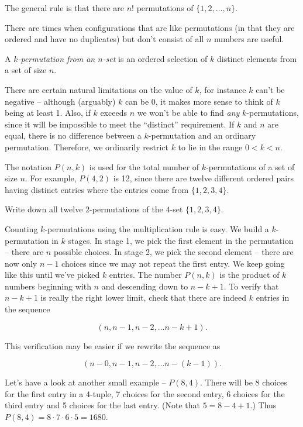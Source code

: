 The general rule is that there are $n!$ permutations of $\{1, 2, \ldots , n\}$.

There are times when configurations that are like permutations (in that they
are ordered and have no duplicates) but don't consist of all $n$ numbers 
are useful.  

\begin{defi}
A \emph{$k$-permutation from an $n$-set} is an ordered selection
of $k$ distinct elements from a set of size $n$.
\end{defi}

There are certain natural limitations on the value of $k$, for instance $k$
can't be negative -- although (arguably) $k$ can be 0, it makes more sense
to think of $k$ being at least 1.  Also, if $k$ exceeds
$n$ we won't be able to find \emph{any} $k$-permutations, 
since it will be impossible
to meet the ``distinct'' requirement.  If $k$ and $n$ are equal, there is 
no difference between a $k$-permutation and an ordinary permutation.  
Therefore, we ordinarily restrict $k$ to lie in the range $0 < k < n$.

The notation $P(n,k)$ is used for the total number of $k$-permutations
of a set of size $n$.  For example, $P(4,2)$ is 12, since there are
twelve different ordered pairs having distinct entries where the 
entries come from $\{1,2,3,4\}$.

\begin{exer}
Write down all twelve $2$-permutations of the $4$-set $\{1,2,3,4\}$.
\end{exer}

Counting $k$-permutations using the multiplication rule is easy.  We
build a $k$-permutation in $k$ stages.  In stage 1, we pick the first 
element in the permutation -- there are $n$ possible choices.  In
stage 2, we pick the second element -- there are now only $n-1$ choices
since we may not repeat the first entry.  We keep going like this until 
we've picked $k$ entries.  The number $P(n,k)$ is the product of $k$
numbers beginning with $n$ and descending down to $n-k+1$.  To verify 
that $n-k+1$ is really the right lower limit, check that there are indeed
$k$ entries in the sequence

\[ (n, n-1, n-2, \ldots n-k+1). \]

This verification may be easier if we rewrite the sequence as

\[ (n-0, n-1, n-2, \ldots n-(k-1) ). \]

Let's have a look at another small example -- $P(8,4)$.  There will be 8
choices for the first entry in a 4-tuple, 7 choices for the second
entry, 6 choices for the third entry and 5 choices for the last entry.
(Note that $5 = 8-4+1$.)  Thus $P(8,4)=8\cdot 7 \cdot 6 \cdot 5 = 1680$.

